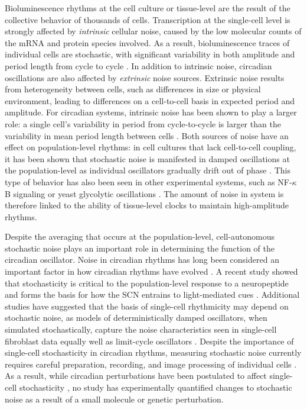 \documentclass[11pt, letterpaper]{article}
\begin{document}
Bioluminescence rhythms at the cell culture or tissue-level are the result of the collective behavior of thousands of cells.
Transcription at the single-cell level is strongly affected by {\itshape intrinsic} cellular noise, caused by the low molecular counts of the mRNA and protein species involved. 
As a result, bioluminescence traces of individual cells are stochastic, with significant variability in both amplitude and period length from cycle to cycle \cite{Welsh2004}. 
In addition to intrinsic noise, circadian oscillations are also affected by {\itshape extrinsic} noise sources.
Extrinsic noise results from heterogeneity between cells, such as differences in size or physical environment, leading to differences on a cell-to-cell basis in expected period and amplitude.
For circadian systems, intrinsic noise has been shown to play a larger role: a single cell's variability in period from cycle-to-cycle is larger than the variability in mean period length between cells \cite{Herzog2004}.
Both sources of noise have an effect on population-level rhythms: in cell cultures that lack cell-to-cell coupling, it has been shown that  stochastic noise is manifested in damped oscillations at the population-level as individual oscillators gradually drift out of phase \cite{Nagoshi2004, Welsh2004}.
This type of behavior has also been seen in other experimental systems, such as NF-$\kappa$B signaling or yeast glycolytic oscillations \cite{Nelson2004, Aon1992}.
The amount of noise in system is therefore linked to the ability of tissue-level clocks to maintain high-amplitude rhythms.

Despite the averaging that occurs at the population-level, cell-autonomous stochastic noise plays an important role in determining the function of the circadian oscillator.
Noise in circadian rhythms has long been considered an important factor in how circadian rhythms have evolved \cite{Barkai2000}.
A recent study showed that stochasticity is critical to the population-level response to a neuropeptide and forms the basis for how the SCN entrains to light-mediated cues \cite{An2013}.
Additional studies have suggested that the basis of single-cell rhythmicity may depend on stochastic noise, as models of deterministically damped oscillators, when simulated stochastically, capture the noise characteristics seen in single-cell fibroblast data equally well as limit-cycle oscillators \cite{Westermark2009}.
Despite the importance of single-cell stochasticity in circadian rhythms, measuring stochastic noise currently requires careful preparation, recording, and image processing of individual cells \cite{Leise2012}. 
As a result, while circadian perturbations have been postulated to affect single-cell stochasticity \cite{Rougemont2007}, no study has experimentally quantified changes to stochastic noise as a result of a small molecule or genetic perturbation.
\end{document}
